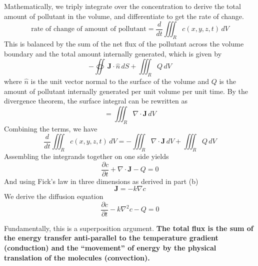 \documentclass[a4paper]{article}
\begin{document}
\begin{enumerate}[label=(\alph*)]
\begin{center}
	\end{center}
	Mathematically, we triply integrate over the concentration to derive the total amount of pollutant in the volume, and differentiate to get the rate of change.
	\[
		\text{rate of change of amount of pollutant} = \frac{d }{dt}\iiint_{R} c \!\left( x,y,z,t \right) \, dV
	\]
	This is balanced by the sum of the net flux of the pollutant across the volume boundary and the total amount internally generated, which is given by
	\[
		-\oiint\, \pmb{J}\cdot \hat{n} \, dS + \iiint_{R} Q \, dV 
	\]
	where \( \hat{n} \) is the unit vector normal to the surface of the volume and \( Q \) is the amount of pollutant internally generated per unit volume per unit time. By the divergence theorem, the surface integral can be rewritten as 
	\[
		=\iiint_{R} \nabla \cdot \pmb{J} \, dV 
	\]
	Combining the terms, we have
	\[
		\frac{d }{dt}\iiint_{R} c \!\left( x,y,z,t \right) \, dV = -\iiint_{R} \nabla \cdot \pmb{J} \, dV + \iiint_{R} Q \, dV
	\]
	Assembling the integrands together on one side yields
	\[
		\frac{\partial c}{\partial t} + \nabla \cdot \pmb{J} - Q = 0 
	\]
	And using Fick's law in three dimensions as derived in part (b)
	\[
		\pmb{J} = -k \nabla c
	\]
	We derive the diffusion equation
	\[
		\frac{\partial c}{\partial t} - k\nabla^{2}c - Q = 0
	\]
\end{enumerate}


Fundamentally, this is a superposition argument. \textbf{The total flux is the sum of the energy transfer anti-parallel to the temperature gradient (conduction) and the ``movement'' of energy by the physical translation of the molecules (convection).}
\end{document}
